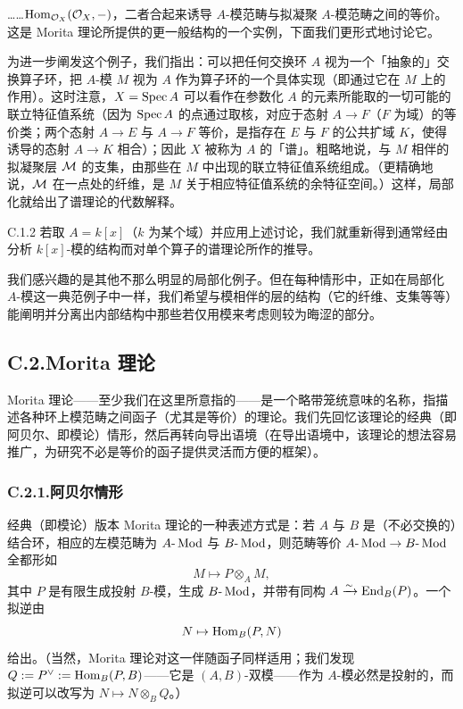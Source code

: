 

……$\operatorname{Hom}_{\mathcal{O}_X}(\mathcal{O}_X,-)$，二者合起来诱导 $A$-模范畴与拟凝聚 $A$-模范畴之间的等价。这是 Morita 理论所提供的更一般结构的一个实例，下面我们更形式地讨论它。

为进一步阐发这个例子，我们指出：可以把任何交换环 $A$ 视为一个「抽象的」交换算子环，把 $A$-模 $M$ 视为 $A$ 作为算子环的一个具体实现（即通过它在 $M$ 上的作用）。这时注意，$X=\operatorname{Spec} A$ 可以看作在参数化 $A$ 的元素所能取的一切可能的联立特征值系统（因为 $\operatorname{Spec} A$ 的点通过取核，对应于态射 $A\to F$（$F$ 为域）的等价类；两个态射 $A\to E$ 与 $A\to F$ 等价，是指存在 $E$ 与 $F$ 的公共扩域 $K$，使得诱导的态射 $A\to K$ 相合）；因此 $X$ 被称为 $A$ 的「谱」。粗略地说，与 $M$ 相伴的拟凝聚层 $\mathcal{M}$ 的支集，由那些在 $M$ 中出现的联立特征值系统组成。（更精确地说，$\mathcal{M}$ 在一点处的纤维，是 $M$ 关于相应特征值系统的余特征空间。）这样，局部化就给出了谱理论的代数解释。

\begin{exam}{C.1.2}\label{thm:a4-19-1}
若取 $A=k[x]$（$k$ 为某个域）并应用上述讨论，我们就重新得到通常经由分析 $k[x]$-模的结构而对单个算子的谱理论所作的推导。
\end{exam}

我们感兴趣的是其他不那么明显的局部化例子。但在每种情形中，正如在局部化 $A$-模这一典范例子中一样，我们希望与模相伴的层的结构（它的纤维、支集等等）能阐明并分离出内部结构中那些若仅用模来考虑则较为晦涩的部分。

\subsection*{C.2.\quad Morita 理论}

Morita 理论——至少我们在这里所意指的——是一个略带笼统意味的名称，指描述各种环上模范畴之间函子（尤其是等价）的理论。我们先回忆该理论的经典（即阿贝尔、即模论）情形，然后再转向导出语境（在导出语境中，该理论的想法容易推广，为研究不必是等价的函子提供灵活而方便的框架）。

\subsubsection*{C.2.1.\quad 阿贝尔情形}

经典（即模论）版本 Morita 理论的一种表述方式是：若 $A$ 与 $B$ 是（不必交换的）结合环，相应的左模范畴为 $A\text{-}\operatorname{Mod}$ 与 $B\text{-}\operatorname{Mod}$，则范畴等价 $A\text{-}\operatorname{Mod}\to B\text{-}\operatorname{Mod}$ 全都形如
\[
M\mapsto P\otimes_A M,
\]
其中 $P$ 是有限生成投射 $B$-模，生成 $B\text{-}\operatorname{Mod}$，并带有同构 $A\xrightarrow{\sim}\operatorname{End}_B(P)$。一个拟逆由
\[
N\mapsto \operatorname{Hom}_B(P,N)
\]
给出。（当然，Morita 理论对这一伴随函子同样适用；我们发现 $Q:=P^\vee:=\operatorname{Hom}_B(P,B)$——它是 $(A,B)$-双模——作为 $A$-模必然是投射的，而拟逆可以改写为 $N\mapsto N\otimes_B Q$。）

